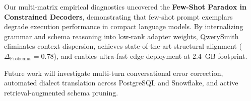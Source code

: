 \documentclass[10pt,twocolumn,letterpaper]{article}
\theoremstyle{definition}
\begin{document}
Our multi-matrix empirical diagnostics uncovered the \textbf{Few-Shot Paradox in Constrained Decoders}, demonstrating that few-shot prompt exemplars degrade execution performance in compact language models. By internalizing grammar and schema reasoning into low-rank adapter weights, QwerySmith eliminates context dispersion, achieves state-of-the-art structural alignment ($\Delta_{\text{Frobenius}} = 0.78$), and enables ultra-fast edge deployment at 2.4~GB footprint.

Future work will investigate multi-turn conversational error correction, automated dialect translation across PostgreSQL and Snowflake, and active retrieval-augmented schema pruning.

\balance


\end{document}
